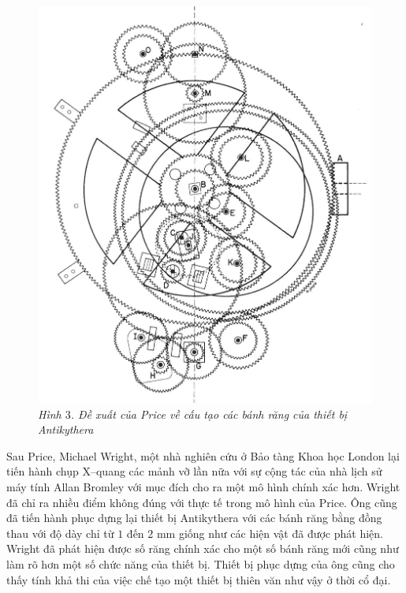 \begin{multicols}{2}
\begin{figure}[H]
		\includegraphics[width= 0.85\linewidth]{4}
		\caption{\small\textit{\color{lichsutoanhoc}Hình $3$. Đề xuất của Price về cấu tạo các bánh răng của thiết bị Antikythera}}
		\vspace*{-10pt}
	\end{figure}
	Sau Price, Michael Wright, một nhà nghiên cứu ở Bảo tàng Khoa học London lại tiến hành chụp X--quang các mảnh vỡ lần nữa với sự cộng tác của nhà lịch sử máy tính Allan Bromley với mục đích cho ra một mô hình chính xác hơn. Wright đã chỉ ra nhiều điểm không đúng với thực tế trong mô hình của Price. Ông cũng đã tiến hành phục dựng lại thiết bị Antikythera với các bánh răng bằng đồng thau với độ dày chỉ từ $1$ đến $2$ mm giống như các hiện vật đã được phát hiện. Wright đã phát hiện được số răng chính xác cho một số bánh răng mới cũng như làm rõ hơn một số chức năng của thiết bị. Thiết bị phục dựng của ông cũng cho thấy tính khả thi của việc chế tạo một thiết bị thiên văn như vậy ở thời cổ đại.
	\begin{figure}[H]
		\vspace*{-5pt}
		\centering
		\captionsetup{labelformat= empty, justification=centering}

\end{figure}
\end{multicols}
